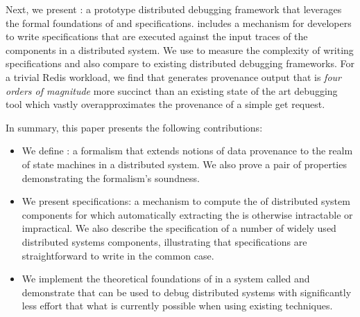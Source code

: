 Next, we present \fluent{}: a prototype distributed debugging framework that
leverages the formal foundations of \watprovenance{} and \watprovenance{}
specifications. \fluent{} includes a mechanism for developers to write
\watprovenance{} specifications that are executed against the input traces of
the components in a distributed system. We use \fluent{} to measure the
complexity of writing \watprovenance{} specifications and also compare
\fluent{} to existing distributed debugging frameworks. For a trivial Redis
workload, we find that \fluent{} generates provenance output that is \emph{four
orders of magnitude} more succinct than an existing state of the art debugging
tool which vastly overapproximates the provenance of a simple get request.

In summary, this paper presents the following contributions:
\begin{itemize}
  \item
    We define \watprovenance{}: a formalism that extends notions of data
    provenance to the realm of state machines in a distributed system. We also
    prove a pair of properties demonstrating the formalism's soundness.
  \item
    We present \watprovenance{} specifications: a mechanism to compute the
    \watprovenance{} of distributed system components for which automatically
    extracting the \watprovenance{} is otherwise intractable or impractical. We
    also describe the \watprovenance{} specification of a number of widely used
    distributed systems components, illustrating that \watprovenance{}
    specifications are straightforward to write in the common case.
  \item
    We implement the theoretical foundations of \watprovenance{} in a system
    called \fluent{} and demonstrate that \fluent{} can be used to debug
    distributed systems with significantly less effort that what is currently
    possible when using existing techniques.
\end{itemize}
